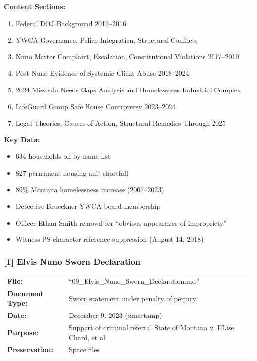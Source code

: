\documentclass[11pt,letterpaper]{article}
\newcommand{\citeref}[1]{\textbf{\color{NavyBlue}[#1]}}
\begin{document}
\vspace{0.1in}

\textbf{Content Sections:}
\begin{enumerate}[leftmargin=*]
\item Federal DOJ Background 2012--2016
\item YWCA Governance, Police Integration, Structural Conflicts
\item Nuno Matter Complaint, Escalation, Constitutional Violations 2017--2019
\item Post-Nuno Evidence of Systemic Client Abuse 2018--2024
\item 2024 Missoula Needs Gaps Analysis and Homelessness Industrial Complex
\item LifeGuard Group Safe House Controversy 2023--2024
\item Legal Theories, Causes of Action, Structural Remedies Through 2025
\end{enumerate}

\textbf{Key Data:}
\begin{itemize}[leftmargin=*]
\item 634 households on by-name list
\item 827 permanent housing unit shortfall
\item 89\% Montana homelessness increase (2007--2023)
\item Detective Brueckner YWCA board membership
\item Officer Ethan Smith removal for ``obvious appearance of impropriety''
\item Witness PS character reference suppression (August 14, 2018)
\end{itemize}

\subsubsection{\citeref{1} Elvis Nuno Sworn Declaration}

\begin{tabular}{@{}p{1.4in}p{4.6in}@{}}
\textbf{File:} & ``09\_Elvis\_Nuno\_Sworn\_Declaration.md''\\
\textbf{Document Type:} & Sworn statement under penalty of perjury\\
\textbf{Date:} & December 9, 2023 (timestamp)\\
\textbf{Purpose:} & Support of criminal referral State of Montana v. ELise Chard, et al.\\
\textbf{Preservation:} & Space files\\
\end{tabular}
\end{document}
